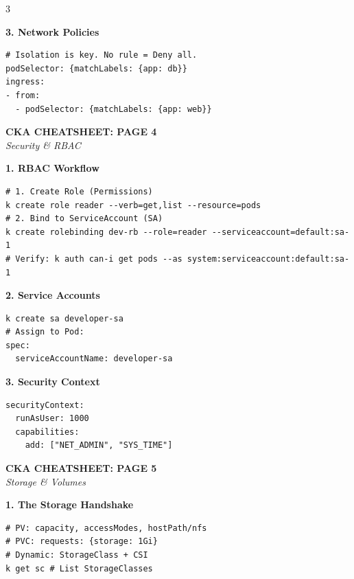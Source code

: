 \documentclass[10pt,landscape]{article}
\newcommand{\sectionheader}[1]{%
    \vspace{2pt}\noindent\colorbox{blue!15}{\parbox{\dimexpr\linewidth-2\fboxsep}{%
    \textbf{#1}}}\vspace{2pt}%
}
\begin{document}
\begin{multicols*}{3}
\sectionheader{3. Network Policies}
\begin{lstlisting}
# Isolation is key. No rule = Deny all.
podSelector: {matchLabels: {app: db}}
ingress:
- from:
  - podSelector: {matchLabels: {app: web}}
\end{lstlisting}

\newpage
\begin{center}\textbf{\Large CKA CHEATSHEET: PAGE 4}\\\textit{Security \& RBAC}\end{center}

\sectionheader{1. RBAC Workflow}
\begin{center}
\end{center}
\begin{lstlisting}
# 1. Create Role (Permissions)
k create role reader --verb=get,list --resource=pods
# 2. Bind to ServiceAccount (SA)
k create rolebinding dev-rb --role=reader --serviceaccount=default:sa-1
# Verify: k auth can-i get pods --as system:serviceaccount:default:sa-1
\end{lstlisting}

\sectionheader{2. Service Accounts}
\begin{lstlisting}
k create sa developer-sa
# Assign to Pod:
spec:
  serviceAccountName: developer-sa
\end{lstlisting}

\sectionheader{3. Security Context}
\begin{lstlisting}
securityContext:
  runAsUser: 1000
  capabilities:
    add: ["NET_ADMIN", "SYS_TIME"]
\end{lstlisting}

\columnbreak

\begin{center}\textbf{\Large CKA CHEATSHEET: PAGE 5}\\\textit{Storage \& Volumes}\end{center}

\sectionheader{1. The Storage Handshake}
\begin{center}
\end{center}
\begin{lstlisting}
# PV: capacity, accessModes, hostPath/nfs
# PVC: requests: {storage: 1Gi}
# Dynamic: StorageClass + CSI
k get sc # List StorageClasses
\end{lstlisting}


\end{multicols*}
\end{document}
